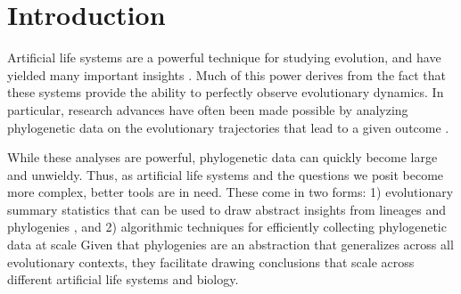 \section{Introduction}
\label{sec:introduction}

Artificial life systems are a powerful technique for studying evolution, and have yielded many important insights \citep{wilkeEvolutionDigitalOrganisms2001, zamanCoevolutionDrivesEmergence2014, goldsbyEvolutionaryOriginSomatic2014}.
Much of this power derives from the fact that these systems provide the ability to perfectly observe evolutionary dynamics.
In particular, research advances have often been made possible by analyzing phylogenetic data on the evolutionary trajectories that lead to a given outcome \citep{lenskiEvolutionaryOriginComplex2003, lalejiniEvolutionaryOriginsPhenotypic2016, johnsonEndosymbiosisBustInfluence2022a}.

While these analyses are powerful, phylogenetic data can quickly become large and unwieldy.
Thus, as artificial life systems and the questions we posit become more complex, better tools are in need.
These come in two forms: 1) evolutionary summary statistics that can be used to draw abstract insights from lineages and phylogenies \citep{dolsonInterpretingTapeLife2020}, and 2) algorithmic techniques for efficiently collecting phylogenetic data at scale \citep{morenoHereditaryStratigraphyGenome2022} Given that phylogenies are an abstraction that generalizes across all evolutionary contexts, they facilitate drawing conclusions that scale across different artificial life systems and biology.



